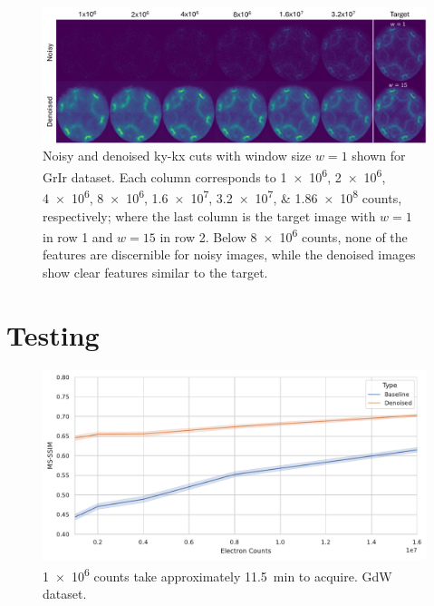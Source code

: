 \begin{figure}[h]
    \centering
    \includegraphics[width=1\linewidth]{images/images_noisy_denoised_with_target.pdf}
    \caption{Noisy and denoised \gls{ky}-\gls{kx} cuts with window size $w=1$ shown for \gls{GrIr} dataset. Each column corresponds to \numlist{1e6;2e6;4e6;8e6;1.6e7;3.2e7;1.86e8} counts, respectively; where the last column is the target image with $w=1$ in row 1 and $w=15$ in row 2. Below \num{8e6} counts, none of the features are discernible for noisy images, while the denoised images show clear features similar to the target.}
    \label{fig:images-noisy-denoised-training}
\end{figure}

\section{Testing}
\begin{figure}[h]
    \centering
    \includegraphics[width=1\linewidth]{images/nn_gdw_msssim.pdf}
    \caption{\num{1e6} counts take approximately \qty{11.5}{min} to acquire. \gls{GdW} dataset.}
    \label{fig:gdw-test-metirc}
\end{figure}


